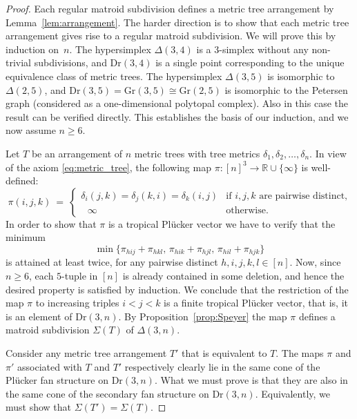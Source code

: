 \documentclass[12pt,a4paper]{amsart}
\theoremstyle{definition}
\newcommand{\R}{{\mathbb{R}}}
\newcommand{\Gr}{{\mathrm{Gr}}}
\newcommand{\Dr}{{\mathrm{Dr}}}
\begin{document}
\begin{proof}
  Each regular matroid subdivision defines a metric tree arrangement
  by Lemma~\ref{lem:arrangement}. The harder direction is to show that
  each metric tree arrangement gives rise to a regular matroid
  subdivision.  We will prove this by induction on~$n$.  The
  hypersimplex $\Delta(3,4)$ is a $3$-simplex without any non-trivial
  subdivisions, and $\Dr(3,4)$ is a single point corresponding to the
  unique equivalence class of metric trees.  The hypersimplex
  $\Delta(3,5)$ is isomorphic to $\Delta(2,5)$, and
  $\Dr(3,5) = \Gr(3,5)\cong\Gr(2,5)$ is isomorphic to the Petersen
  graph (considered as a one-dimensional polytopal complex).  Also in
  this case the result can be verified directly. This establishes the
  basis of our induction, and we now assume $n\ge 6$.

  Let $T$ be an arrangement of $n$ metric trees with tree metrics
  $\delta_1,\delta_2,\dots,\delta_n$.  In view of the axiom
  \eqref{eq:metric_tree}, the following map 
  $\pi:[n]^3\to\R\cup\{\infty\}$ is well-defined:
  \[
  \pi(i,j,k) \ = \
  \begin{cases}
    \delta_i(j,k)=\delta_j(k,i)=\delta_k(i,j) & \text{if $i,j,k$ are
      pairwise distinct,} \\
    \,\,\,\, \infty & \text{otherwise.}
  \end{cases}
  \]
  In order to show that $\pi$ is a tropical
  Pl\"ucker vector we have to verify that the minimum
  \[
  \min\bigl\{\pi_{hij}+\pi_{hkl}, \, \pi_{hik}+\pi_{hjl}, \, \pi_{hil}+\pi_{hjk}\bigr\}
  \]
  is attained at least twice, for any pairwise distinct
  $h,i,j,k,l\in[n]$.  Now, since $n\ge 6$, each $5$-tuple in $[n]$ is
  already contained in some deletion, and hence the desired property
  is satisfied by induction. We conclude that the restriction of the
  map $\pi$ to increasing triples $i<j<k$ is a finite tropical
  Pl\"ucker vector, that is, it is an element of $\Dr(3,n)$.  By
  Proposition~\ref{prop:Speyer} the map $\pi$ defines a matroid
  subdivision $\Sigma(T)$ of $\Delta(3,n)$.

  Consider any metric tree arrangement $T'$ that is equivalent to $T$.
  The maps $\pi$ and $\pi'$ associated with $T$ and $T'$ respectively
  clearly lie in the same cone of the Pl\"ucker fan structure on
  $\Dr(3,n)$. What we must prove is that they are also in the same
  cone of the secondary fan structure on $\Dr(3,n)$. Equivalently, we
  must show that $\Sigma(T')=\Sigma(T)$.  


\end{proof}
\end{document}
